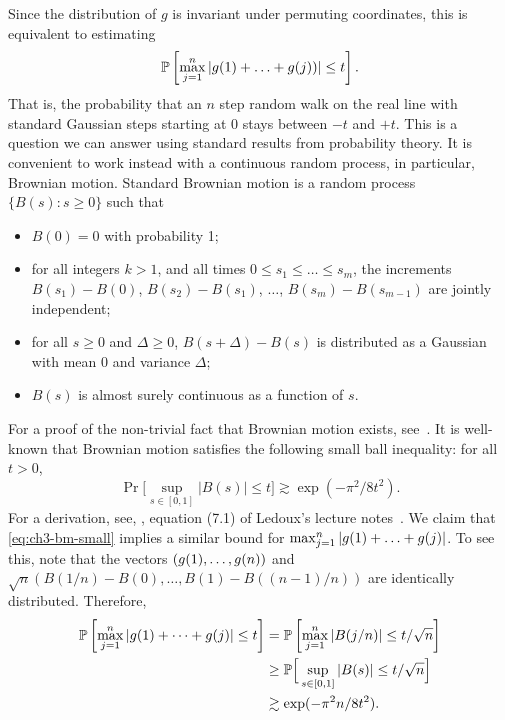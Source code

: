  Since the distribution of \(g\) is
invariant under permuting coordinates, this is equivalent to
estimating
\[
  \mathbb{P}\left[\max_{j = 1}^n\left|g(1) + \ldots + g(j))\right| \le t\right].
\]
That is, the probability that an \(n\) step
random walk on the real line with standard Gaussian steps starting at
\(0\) stays between \(-t\) and \(+t\). This is a question we
can answer using standard results from probability theory. It is
convenient to work instead with a continuous random process, in
particular, Brownian motion. Standard Brownian motion is a random
process $\{B(s): s \ge 0\}$ such that
\begin{itemize}
\item $B(0) = 0$ with probability 1;
\item for all integers $k > 1$, and all times $0 \le s_1 \le \ldots
  \le s_m$, the increments $B(s_1)-B(0)$, $B(s_2) - B(s_{1})$, $\ldots$, $B(s_m) -
  B(s_{m-1})$ are jointly independent;
\item for all $s \ge 0$ and $\Delta\ge 0$, $B(s+\Delta) - B(s)$ is
  distributed as a Gaussian with mean $0$ and variance $\Delta$;
\item $B(s)$ is almost surely continuous as a function of $s$.
\end{itemize}
For a proof of the non-trivial fact that Brownian motion exists,
see~\cite{PeresMorters}. It is well-known that Brownian motion
satisfies the following small ball inequality: for all $t > 0$, 
\begin{equation}
  \label{eq:ch3-bm-small}
  \Pr\Big[\sup_{s \in [0,1]} |B(s)| \le t\Big] \gtrsim \exp(-\pi^2/8t^2).
\end{equation}
For a derivation, see,
\eg, equation (7.1) of Ledoux's lecture notes~\cite{Ledoux96}. We
claim that \eqref{eq:ch3-bm-small} implies a similar bound for
$\max_{j = 1}^n\left|g(1) + \ldots + g(j)\right|$.
To see this, note that the vectors $(g(1), \ldots, g(n))$ and
$\sqrt{n}(B(1/n) - B(0),\ldots, B(1) - B((n-1)/n))$ are identically
distributed. Therefore,
\begin{align}
  \mathbb{P}\left[\max_{j = 1}^n\left|g(1) + \cdots + g(j)\right| \le t\right]
  &=
    \mathbb{P}\left[\max_{j = 1}^n\left|B(j/n)\right| \le t/\sqrt{n}\right]\notag\\
  &\ge
    \mathbb{P}\Big[\sup_{s \in [0,1]} |B(s)| \le t/\sqrt{n}\Big]\notag\\
  &\gtrsim    \exp(-\pi^2n/8t^2).\label{eq:ch3-smallball}
\end{align}


